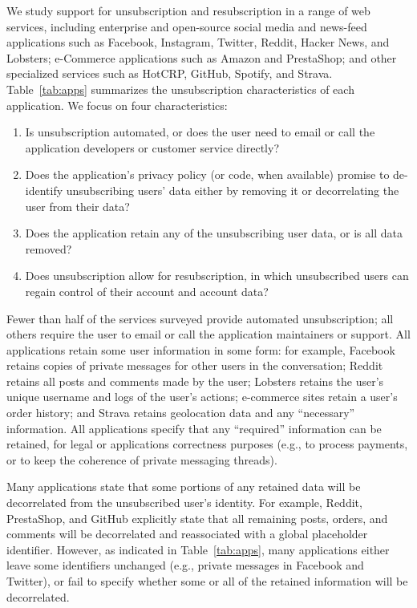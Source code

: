 We study support for unsubscription and resubscription in a range of web
services, including enterprise and open-source social media and news-feed applications such as
Facebook, Instagram, Twitter, Reddit, Hacker News, and Lobsters; e-Commerce applications such as
Amazon and PrestaShop; and other specialized services such as HotCRP, GitHub, Spotify, and Strava.
Table~\ref{tab:apps} summarizes the unsubscription characteristics of each application. We focus on
four characteristics: 
\begin{enumerate}
    \item Is unsubscription automated, or does the user need to email or call the
application developers or customer service directly? 
    \item Does the application's privacy policy (or code, when available) promise to de-identify 
        unsubscribing users' data either by removing it or decorrelating the user from their data?
    \item Does the application retain any of the unsubscribing user data, or is all data removed?
    \item Does unsubscription allow for resubscription, in which unsubscribed users can regain control of their
        account and account data?
\end{enumerate}

Fewer than half of the services surveyed provide automated unsubscription; all others require the
user to email or call the application maintainers or support. 
All applications retain some user information in some form: for example, Facebook retains copies of
private messages for other users in the conversation; Reddit retains all posts and comments made by
the user; Lobsters retains the user's unique username and logs of the user's actions; e-commerce
sites retain a user's order history; and Strava retains geolocation data and any
``necessary'' information. All applications specify that any
``required'' information can be retained, for legal or applications correctness purposes (e.g., to
process payments, or to keep the coherence of private messaging threads).

Many applications state that some portions of any retained data will be decorrelated from the
unsubscribed user's identity. For example, Reddit, PrestaShop, and GitHub explicitly state that all
remaining posts, orders, and comments will be decorrelated and reassociated with a global placeholder identifier.
However, as indicated in Table~\ref{tab:apps}, many applications either leave some identifiers
unchanged (e.g., private messages in Facebook and Twitter), or fail to specify whether some or all
of the retained information will be decorrelated.

